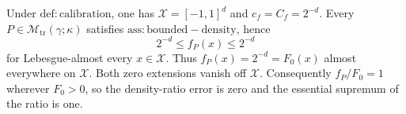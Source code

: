 Under \(\mathrm{def:calibration}\), one has \(\mathcal X=[-1,1]^d\) and \(c_f=C_f=2^{-d}\). Every \(P\in\mathcal M_{\mathrm{tr}}(\gamma;\kappa)\) satisfies \(\mathrm{ass:bounded-density}\), hence
\[
2^{-d}\le f_P(x)\le 2^{-d}
\]
for Lebesgue-almost every \(x\in\mathcal X\). Thus \(f_P(x)=2^{-d}=F_0(x)\) almost everywhere on \(\mathcal X\). Both zero extensions vanish off \(\mathcal X\). Consequently \(f_P/F_0=1\) wherever \(F_0>0\), so the density-ratio error is zero and the essential supremum of the ratio is one.